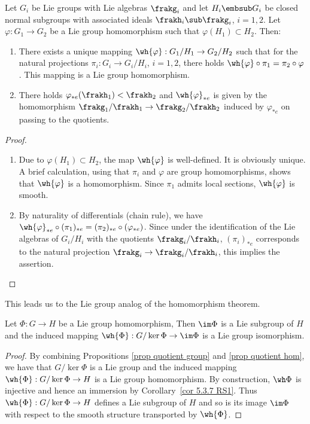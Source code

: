 \begin{prop}\label{prop quotient hom}
    Let $G_i$ be Lie groups with Lie algebras $\frakg_i$ and let $H_i\embsub G_i$ be closed normal subgroups with associated ideals $\frakh_i\sub \frakg_i$, $i=1,2$. Let $\varphi:G_1\to G_2$ be a Lie group homomorphism such that $\varphi(H_1)\subset H_2$. Then:
    \begin{enumerate}
        \item There exists a unique mapping $\wh{\varphi}:G_1\slash H_1\to G_2\slash H_2$ such that for the natural projections $\pi_i:G_i\to G_i\slash H_i$, $i=1,2$, there holds $\wh{\varphi}\circ\pi_1=\pi_2\circ \varphi$. This mapping is a Lie group homomorphism.
        \item There holds $\varphi_{\ast e}(\frakh_1)<\frakh_2$ and $\wh{\varphi}_{\ast e}$ is given by the homomorphism $\frakg_1\slash\frakh_1\to \frakg_2\slash\frakh_2$ induced by $\varphi_{\ast e}$ on passing to the quotients.
    \end{enumerate}
\end{prop}
\begin{proof}
    \begin{enumerate}
        \item Due to $\varphi(H_1)\subset H_2$, the map $\wh{\varphi}$ is well-defined. It is obviously unique. A brief calculation, using that $\pi_i$ and $\varphi$ are group homomorphisms, shows that $\wh{\varphi}$ is a homomorphism. Since $\pi_1$ admits local sections, $\wh{\varphi}$ is smooth.
        \item By naturality of differentials (chain rule), we have $\wh{\varphi}_{\ast e}\circ (\pi_1)_{\ast e}=(\pi_2)_{\ast e}\circ (\varphi_{\ast e})$. Since under the identification of the Lie algebras of $G_i\slash H_i$ with the quotients $\frakg_i\slash \frakh_i$, $(\pi_i)_{\ast e}$ corresponds to the natural projection $\frakg_i\to \frakg_i\slash \frakh_i$, this implies the assertion.
    \end{enumerate}
\end{proof}

This leads us to the Lie group analog of the homomorphism theorem.

\begin{prop}
    Let $\Phi:G\to H$ be a Lie group homomorphism, Then $\im\Phi$ is a Lie subgroup of $H$ and the induced mapping $\wh{\Phi}:G\slash \ker \Phi\to \im\Phi$ is a Lie group isomorphism.
\end{prop}
\begin{proof}
    By combining Propositions \ref{prop quotient group} and \ref{prop quotient hom}, we have that $G\slash \ker\Phi$  is a Lie group and the induced mapping $\wh{\Phi}:G\slash\ker\Phi\to H$ is a Lie group homomorphism. By construction, $\wh\Phi$ is injective and hence an immersion by Corollary~\ref{cor 5.3.7 RS1}. Thus $\wh{\Phi}:G\slash \ker\Phi\to H$ defines a Lie subgroup of $H$ and so is its image $\im\Phi$ with  respect to the smooth structure transported by $\wh{\Phi}$.
\end{proof}

